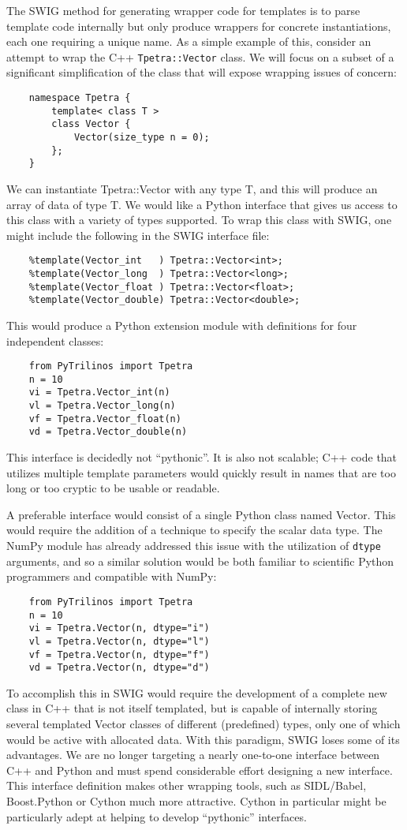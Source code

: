 \documentclass[11pt]{article}
\begin{document}
The SWIG method for generating wrapper code for templates is to parse template code internally but only produce wrappers for concrete instantiations, each one requiring a unique name.  As a simple example of this, consider an attempt to wrap the C++ {\tt Tpetra::Vector} class.  We will focus on a subset of a significant simplification of the class that will expose wrapping issues of concern:
\begin{verbatim}
    namespace Tpetra {
        template< class T >
        class Vector {
            Vector(size_type n = 0);
        };
    }
\end{verbatim}
We can instantiate Tpetra::Vector with any type T, and this will produce an array of data of type T.  We would like a Python interface that gives us access to this class with a variety of types supported.  To wrap this class with SWIG, one might include the following in the SWIG interface file:
\begin{verbatim}
    %template(Vector_int   ) Tpetra::Vector<int>;
    %template(Vector_long  ) Tpetra::Vector<long>;
    %template(Vector_float ) Tpetra::Vector<float>;
    %template(Vector_double) Tpetra::Vector<double>;
\end{verbatim}
This would produce a Python extension module with definitions for four independent classes:
\begin{verbatim}
    from PyTrilinos import Tpetra
    n = 10
    vi = Tpetra.Vector_int(n)
    vl = Tpetra.Vector_long(n)
    vf = Tpetra.Vector_float(n)
    vd = Tpetra.Vector_double(n)
\end{verbatim}
This interface is decidedly not ``pythonic''.  It is also not scalable; C++ code that utilizes multiple template parameters would quickly result in names that are too long or too cryptic to be usable or readable.

A preferable interface would consist of a single Python class named Vector.  This would require the addition of a technique to specify the scalar data type.  The NumPy module has already addressed this issue with the utilization of {\tt dtype} arguments, and so a similar solution would be both familiar to scientific Python programmers and compatible with NumPy:
\begin{verbatim}
    from PyTrilinos import Tpetra
    n = 10
    vi = Tpetra.Vector(n, dtype="i")
    vl = Tpetra.Vector(n, dtype="l")
    vf = Tpetra.Vector(n, dtype="f")
    vd = Tpetra.Vector(n, dtype="d")
\end{verbatim}
To accomplish this in SWIG would require the development of a complete new class in C++ that is not itself templated, but is capable of internally storing several templated Vector classes of different (predefined) types, only one of which would be active with allocated data.  With this paradigm, SWIG loses some of its advantages.  We are no longer targeting a nearly one-to-one interface between C++ and Python and must spend considerable effort designing a new interface.  This interface definition makes other wrapping tools, such as SIDL/Babel, Boost.Python or Cython much more attractive.  Cython in particular might be particularly adept at helping to develop ``pythonic'' interfaces.
\end{document}
